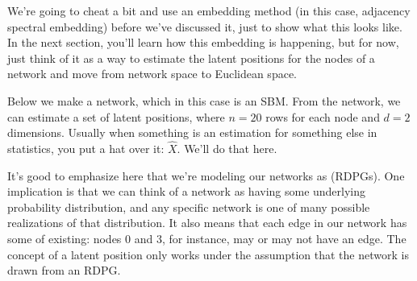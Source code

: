 \documentclass[letterpaper,10pt,english]{jupyterBook}
\begin{document}
\sphinxAtStartPar
We’re going to cheat a bit and use an embedding method (in this case, adjacency spectral embedding) before we’ve discussed it, just to show what this looks like. In the next section, you’ll learn how this embedding is happening, but for now, just think of it as a way to estimate the latent positions for the nodes of a network and move from network space to Euclidean space.

\sphinxAtStartPar
Below we make a network, which in this case is an SBM. From the network, we can estimate a set of latent positions, where \(n=20\) rows for each node and \(d=2\) dimensions. Usually when something is an estimation for something else in statistics, you put a hat over it: \(\hat{X}\). We’ll do that here.

\begin{sphinxVerbatim}[commandchars=\\\{\}]
   
     
   

  \PYG{p}{[}\PYG{p}{[} \PYG{p}{]} 
              \PYG{p}{[} \PYG{p}{]}\PYG{p}{]}
  \PYG{p}{[} \PYG{p}{]}
     

  
  
\end{sphinxVerbatim}

\noindent{}

\sphinxAtStartPar
It’s good to emphasize here that we’re modeling our networks as  (RDPGs). One implication is that we can think of a network as having some underlying probability distribution, and any specific network is one of many possible realizations of that distribution. It also means that each edge in our network has some  of existing: nodes 0 and 3, for instance, may or may not have an edge. The concept of a latent position only works under the assumption that the network is drawn from an RDPG.
\end{document}
